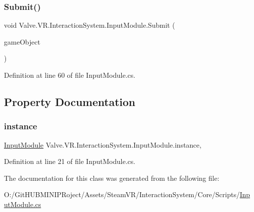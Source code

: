 \subsubsection{\texorpdfstring{Submit()}{Submit()}}
{\footnotesize\ttfamily void Valve.\+V\+R.\+Interaction\+System.\+Input\+Module.\+Submit (\begin{DoxyParamCaption}\item[{Game\+Object}]{game\+Object }\end{DoxyParamCaption})}



Definition at line 60 of file Input\+Module.\+cs.



\subsection{Property Documentation}
\mbox{\label{class_valve_1_1_v_r_1_1_interaction_system_1_1_input_module_a88f1603f8015d72a04672539920fbcbf}} 
\subsubsection{\texorpdfstring{instance}{instance}}
{\footnotesize\ttfamily \mbox{\hyperlink{class_valve_1_1_v_r_1_1_interaction_system_1_1_input_module}{Input\+Module}} Valve.\+V\+R.\+Interaction\+System.\+Input\+Module.\+instance\hspace{0.3cm}{\ttfamily [static]}, {\ttfamily [get]}}



Definition at line 21 of file Input\+Module.\+cs.



The documentation for this class was generated from the following file\+:\begin{DoxyCompactItemize}
\item 
O\+:/\+Git\+H\+U\+B\+M\+I\+N\+I\+P\+Roject/\+Assets/\+Steam\+V\+R/\+Interaction\+System/\+Core/\+Scripts/\mbox{\hyperlink{_input_module_8cs}{Input\+Module.\+cs}}\end{DoxyCompactItemize}
